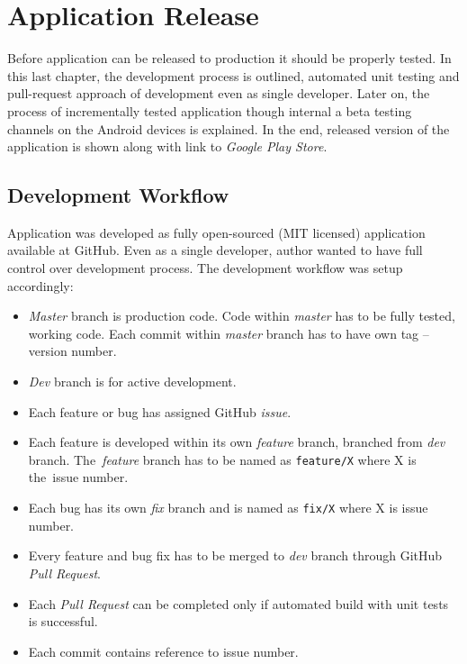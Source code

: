 \chapter{Application Release}
\label{ch:testing}

Before application can be released to production it should be properly tested. In this last chapter, the development process is outlined, automated unit testing and pull-request approach of development even as single developer. Later on, the process of incrementally tested application though internal a beta testing channels on the Android devices is explained. In the end, released version of the application is shown along with link to \textit{Google Play Store}. 

\section{Development Workflow}
Application was developed as fully open-sourced (MIT licensed) application available at GitHub. Even as a single developer, author wanted to have full control over development process. The development workflow was setup accordingly:

\begin{itemize}
    \item \textit{Master} branch is production code. Code within \textit{master} has to be fully tested, working code. Each commit within \textit{master} branch has to have own tag -- version number.
    \item \textit{Dev} branch is for active development. 
    \item Each feature or bug has assigned GitHub \textit{issue}.  
    \item Each feature is developed within its own \textit{feature} branch, branched from \textit{dev} branch. The~\textit{feature} branch has to be named as \verb|feature/X| where X is the~issue number.
    \item Each bug has its own \textit{fix} branch and is named as \verb|fix/X| where X is issue number.
    \item Every feature and bug fix has to be merged to \textit{dev} branch through GitHub \textit{Pull Request}.
    \item Each \textit{Pull Request} can be completed only if automated build with unit tests is successful.
    \item Each commit contains reference to issue number. 
\end{itemize}

